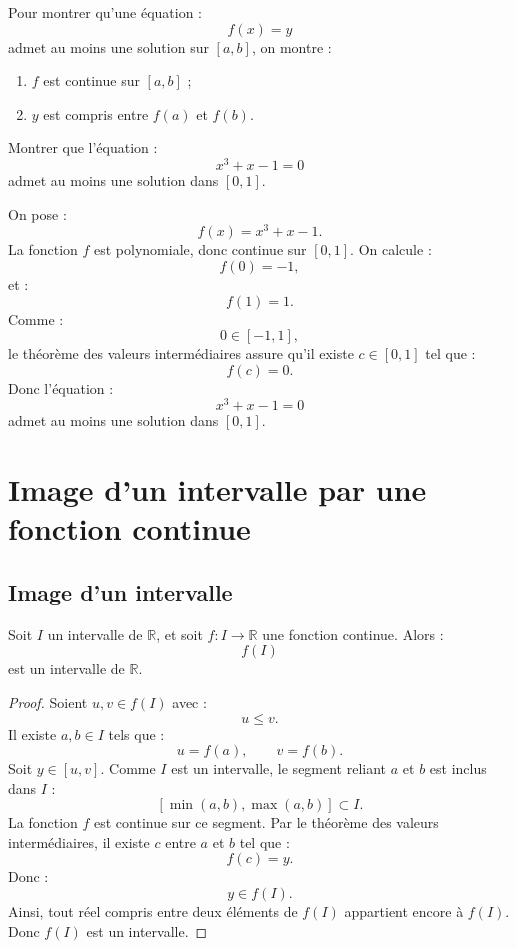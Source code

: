 \documentclass[11pt,a4paper]{article}
\newcommand{\R}{\mathbb R}
\begin{document}
\begin{methodbox}
Pour montrer qu'une équation :
\[
f(x)=y
\]
admet au moins une solution sur \([a,b]\), on montre :
\begin{enumerate}
    \item \(f\) est continue sur \([a,b]\) ;
    \item \(y\) est compris entre \(f(a)\) et \(f(b)\).
\end{enumerate}
\end{methodbox}

\begin{exercicebox}
Montrer que l'équation :
\[
x^3+x-1=0
\]
admet au moins une solution dans \([0,1]\).
\end{exercicebox}

\begin{correctionbox}
On pose :
\[
f(x)=x^3+x-1.
\]
La fonction \(f\) est polynomiale, donc continue sur \([0,1]\).  
On calcule :
\[
f(0)=-1,
\]
et :
\[
f(1)=1.
\]
Comme :
\[
0\in[-1,1],
\]
le théorème des valeurs intermédiaires assure qu'il existe \(c\in[0,1]\) tel que :
\[
f(c)=0.
\]
Donc l'équation :
\[
x^3+x-1=0
\]
admet au moins une solution dans \([0,1]\).
\end{correctionbox}

\section{Image d'un intervalle par une fonction continue}

\subsection{Image d'un intervalle}

\begin{theorembox}
Soit \(I\) un intervalle de \(\R\), et soit \(f:I\to\R\) une fonction continue.  
Alors :
\[
f(I)
\]
est un intervalle de \(\R\).
\end{theorembox}

\begin{proof}
Soient \(u,v\in f(I)\) avec :
\[
u\leq v.
\]
Il existe \(a,b\in I\) tels que :
\[
u=f(a),
\qquad
v=f(b).
\]
Soit \(y\in[u,v]\).  
Comme \(I\) est un intervalle, le segment reliant \(a\) et \(b\) est inclus dans \(I\) :
\[
[\min(a,b),\max(a,b)]\subset I.
\]
La fonction \(f\) est continue sur ce segment.  
Par le théorème des valeurs intermédiaires, il existe \(c\) entre \(a\) et \(b\) tel que :
\[
f(c)=y.
\]
Donc :
\[
y\in f(I).
\]
Ainsi, tout réel compris entre deux éléments de \(f(I)\) appartient encore à \(f(I)\).  
Donc \(f(I)\) est un intervalle.
\end{proof}
\end{document}
